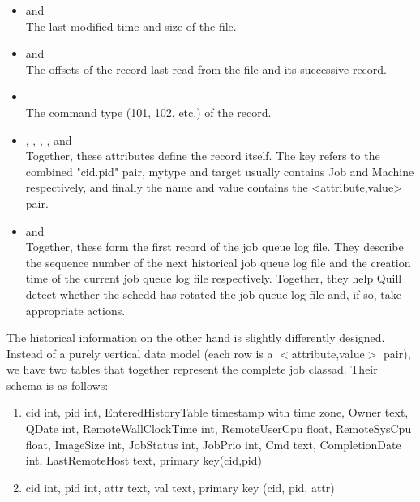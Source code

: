 \begin{itemize}
\item {} and \\
	The last modified time and size of the file.

\item {} and \\
	The offsets of the record last read from the file and its successive record.

\item {}\\
	The command type (101, 102, etc.) of the record.

\item	{}, 
		, 
		,
		,
		and
		\\
	Together, these attributes define the record itself.	The key
	refers to the combined "cid.pid" pair, mytype and target usually
	contains Job and Machine respectively, and finally the name and
	value contains the <attribute,value> pair.

\item {} and \\
	Together, these form the first record of the job queue log file. They 
	describe the sequence number of the next historical job queue log file
	and the creation time of the current job queue log file respectively.
	Together, they help Quill detect whether the schedd has rotated the 
	job queue log file and, if so, take appropriate actions. 

\end{itemize}

The historical information on the other hand is slightly differently
designed.  Instead of a purely vertical data model (each row is a
$<$attribute,value$>$ pair), we have two tables that together represent the
complete job classad.  Their schema is as follows:

\begin{enumerate}

\item {}
        {cid                  int,
        pid                  int,
	EnteredHistoryTable  timestamp with time zone,
        Owner                text,
        QDate                int,
        RemoteWallClockTime  int,
        RemoteUserCpu        float,
        RemoteSysCpu         float,
        ImageSize            int,
        JobStatus            int,
        JobPrio              int,
        Cmd                  text,
        CompletionDate       int,
        LastRemoteHost       text,
        primary key(cid,pid)}

\item {}
	{cid int, pid int, attr text, val text, primary key
	(cid, pid, attr)}

\end{enumerate}

